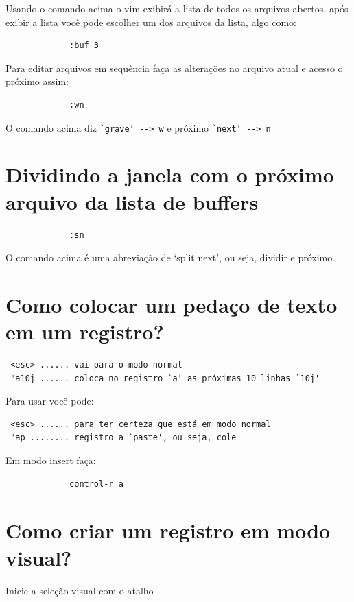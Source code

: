\documentclass[10pt,a4paper,openany]{book}
\begin{document}
Usando o comando acima o vim exibirá a lista de todos os arquivos
abertos, após exibir a lista você pode escolher um dos arquivos da
lista, algo como:

\begin{verbatim}
			 :buf 3
\end{verbatim}

Para editar arquivos em sequência faça as alterações no arquivo atual
e acesso o próximo assim:

\begin{verbatim}
			 :wn
\end{verbatim}

O comando acima diz \verb|`grave' --> w|  e próximo \verb|`next' --> n|

\section{Dividindo a janela com o próximo arquivo da lista de buffers}
\label{Dividindo a janela com o próximo arquivo da lista de buffers}

\begin{verbatim}
			 :sn
\end{verbatim}

O comando acima é uma abreviação de `split next', ou seja, dividir e próximo.

\section{Como colocar um pedaço de texto em um registro?}
\label{Como colocar um pedaço de texto em um registro?}

\begin{verbatim}
 <esc> ...... vai para o modo normal
 "a10j ...... coloca no registro `a' as próximas 10 linhas `10j'
\end{verbatim}

Para usar você pode:

\begin{verbatim}
 <esc> ...... para ter certeza que está em modo normal
 "ap ........ registro a `paste', ou seja, cole
\end{verbatim}

Em modo insert faça:

\begin{verbatim}
			 control-r a
\end{verbatim}

\section{Como criar um registro em modo visual?}
\label{Como criar um registro em modo visual?}
Inicie a seleção visual com o atalho
\end{document}
